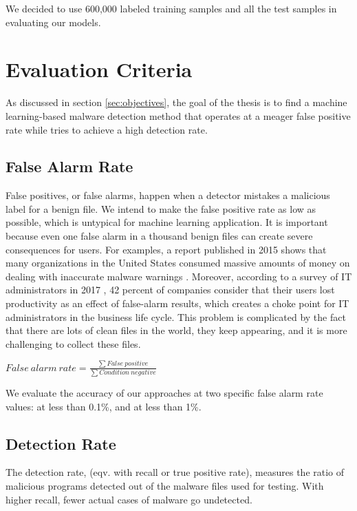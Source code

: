 We decided to use 600,000 labeled training samples and all the test samples in evaluating our models.

\section{Evaluation Criteria}

As discussed in section \ref{sec:objectives}, the goal of the thesis is to find a machine learning-based malware detection method that operates at a meager false positive rate while tries to achieve a high detection rate.

\subsection{False Alarm Rate}

False positives, or false alarms, happen when a detector mistakes a malicious label for a benign file. We intend to make the false positive rate as low as possible, which is untypical for machine learning application. It is important because even one false alarm in a thousand benign files can create severe consequences for users. For examples, a report published in 2015 shows that many organizations in the United States consumed massive amounts of money on dealing with inaccurate malware warnings \cite{eduard2015false}. Moreover, according to a survey of IT administrators in 2017 \cite{jonathan2017survey}, 42 percent of companies consider that their users lost productivity as an effect of false-alarm results, which creates a choke point for IT administrators in the business life cycle. This problem is complicated by the fact that there are lots of clean files in the world, they keep appearing, and it is more challenging to collect these files. 

\begin{center}
    ${False\ alarm\ rate} =  \frac{\sum False\ positive}{\sum Condition\ negative}$
\end{center}

We evaluate the accuracy of our approaches at two specific false alarm rate values: at less than 0.1\%, and at less than 1\%.

\subsection{Detection Rate}

The detection rate, (eqv. with recall or true positive rate), measures the ratio of malicious programs detected out of the malware files used for testing. With higher recall, fewer actual cases of malware go undetected.

